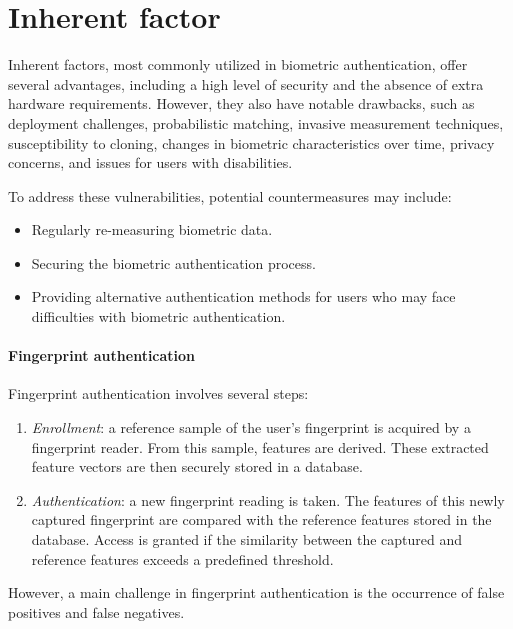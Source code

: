 \section{Inherent factor}

Inherent factors, most commonly utilized in biometric authentication, offer several advantages, including a high level of security and the absence of extra hardware requirements. 
However, they also have notable drawbacks, such as deployment challenges, probabilistic matching, invasive measurement techniques, susceptibility to cloning, changes in biometric characteristics over time, privacy concerns, and issues for users with disabilities.

To address these vulnerabilities, potential countermeasures may include:
\begin{itemize}
    \item Regularly re-measuring biometric data.
    \item Securing the biometric authentication process.
    \item Providing alternative authentication methods for users who may face difficulties with biometric authentication.
\end{itemize}

\paragraph*{Fingerprint authentication}
Fingerprint authentication involves several steps:
\begin{enumerate}
    \item \textit{Enrollment}: a reference sample of the user's fingerprint is acquired by a fingerprint reader. 
        From this sample, features are derived. 
        These extracted feature vectors are then securely stored in a database.
    \item \textit{Authentication}: a new fingerprint reading is taken. 
        The features of this newly captured fingerprint are compared with the reference features stored in the database. 
        Access is granted if the similarity between the captured and reference features exceeds a predefined threshold.
\end{enumerate}
However, a main challenge in fingerprint authentication is the occurrence of false positives and false negatives.